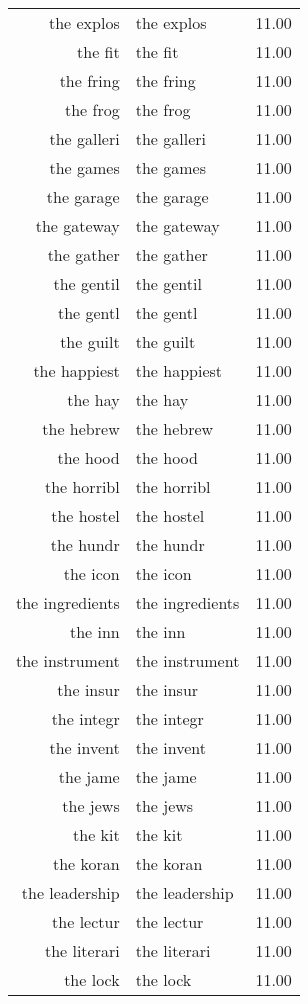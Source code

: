 \begin{table}[ht]
\begin{tabular}{rlr}
  the explos & the explos & 11.00 \\ 
  the fit & the fit & 11.00 \\ 
  the fring & the fring & 11.00 \\ 
  the frog & the frog & 11.00 \\ 
  the galleri & the galleri & 11.00 \\ 
  the games & the games & 11.00 \\ 
  the garage & the garage & 11.00 \\ 
  the gateway & the gateway & 11.00 \\ 
  the gather & the gather & 11.00 \\ 
  the gentil & the gentil & 11.00 \\ 
  the gentl & the gentl & 11.00 \\ 
  the guilt & the guilt & 11.00 \\ 
  the happiest & the happiest & 11.00 \\ 
  the hay & the hay & 11.00 \\ 
  the hebrew & the hebrew & 11.00 \\ 
  the hood & the hood & 11.00 \\ 
  the horribl & the horribl & 11.00 \\ 
  the hostel & the hostel & 11.00 \\ 
  the hundr & the hundr & 11.00 \\ 
  the icon & the icon & 11.00 \\ 
  the ingredients & the ingredients & 11.00 \\ 
  the inn & the inn & 11.00 \\ 
  the instrument & the instrument & 11.00 \\ 
  the insur & the insur & 11.00 \\ 
  the integr & the integr & 11.00 \\ 
  the invent & the invent & 11.00 \\ 
  the jame & the jame & 11.00 \\ 
  the jews & the jews & 11.00 \\ 
  the kit & the kit & 11.00 \\ 
  the koran & the koran & 11.00 \\ 
  the leadership & the leadership & 11.00 \\ 
  the lectur & the lectur & 11.00 \\ 
  the literari & the literari & 11.00 \\ 
  the lock & the lock & 11.00 \\ 

\end{tabular}
\end{table}
